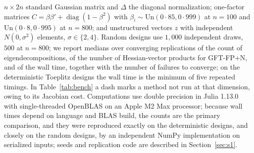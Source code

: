 \documentclass[11pt]{article}
\newcommand{\diag}{\operatorname{diag}}
\begin{document}
$n\times2n$ standard Gaussian matrix and $\Delta$ the diagonal
normalization; one-factor matrices
$C=\beta\beta'+\diag(1-\beta^{2})$ with
$\beta_i\sim\mathrm{Un}(0{\cdot}85,0{\cdot}999)$ at $n=100$ and
$\mathrm{Un}(0{\cdot}8,0{\cdot}995)$ at $n=800$; and unstructured
vectors $z$ with independent $N(0,\sigma^{2})$ elements,
$\sigma\in\{2,4\}$. Random designs use $1{,}000$ independent draws,
$500$ at $n=800$; we report medians over converging replications of the count of
eigendecompositions, of the number of Hessian-vector products for
GFT-FP+N, and of the wall time, together with the number of failures
to converge; on the deterministic Toeplitz designs the wall time is
the minimum of five repeated timings. In Table~\ref{tab:bench} a dash marks a method
not run at that dimension, owing to its Jacobian cost. Computations use double
precision in Julia 1.13.0 with single-threaded OpenBLAS on an Apple
M2 Max processor; because wall times depend on language and BLAS build,
the counts are the primary comparison, and they were reproduced exactly
on the deterministic designs, and closely on the random designs, by an
independent NumPy implementation on serialized inputs; seeds and
replication code are described in Section~\ref{sec:s1}.
\end{document}
